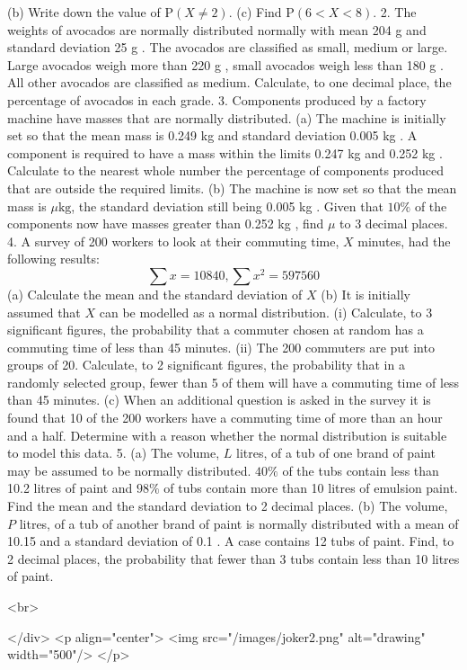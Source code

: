 (b) Write down the value of $\mathrm{P}(X \neq 2)$.
(c) Find $\mathrm{P}(6<X<8)$.
2. The weights of avocados are normally distributed normally with mean 204 g and standard deviation 25 g . The avocados are classified as small, medium or large. Large avocados weigh more than 220 g , small avocados weigh less than 180 g . All other avocados are classified as medium. Calculate, to one decimal place, the percentage of avocados in each grade.
3. Components produced by a factory machine have masses that are normally distributed.
(a) The machine is initially set so that the mean mass is 0.249 kg and standard deviation 0.005 kg . A component is required to have a mass within the limits 0.247 kg and 0.252 kg . Calculate to the nearest whole number the percentage of components produced that are outside the required limits.
(b) The machine is now set so that the mean mass is $\mu \mathrm{kg}$, the standard deviation still being 0.005 kg . Given that $10 \%$ of the components now have masses greater than 0.252 kg , find $\mu$ to 3 decimal places.
4. A survey of 200 workers to look at their commuting time, $X$ minutes, had the following results:
$$
\sum x=10840, \sum x^{2}=597560
$$
(a) Calculate the mean and the standard deviation of $X$
(b) It is initially assumed that $X$ can be modelled as a normal distribution.
(i) Calculate, to 3 significant figures, the probability that a commuter chosen at random has a commuting time of less than 45 minutes.
(ii) The 200 commuters are put into groups of 20. Calculate, to 2 significant figures, the probability that in a randomly selected group, fewer than 5 of them will have a commuting time of less than 45 minutes.
(c) When an additional question is asked in the survey it is found that 10 of the 200 workers have a commuting time of more than an hour and a half. Determine with a reason whether the normal distribution is suitable to model this data.
5. (a) The volume, $L$ litres, of a tub of one brand of paint may be assumed to be normally distributed. $40 \%$ of the tubs contain less than 10.2 litres of paint and $98 \%$ of tubs contain more than 10 litres of emulsion paint. Find the mean and the standard deviation to 2 decimal places.
(b) The volume, $P$ litres, of a tub of another brand of paint is normally distributed with a mean of 10.15 and a standard deviation of 0.1 . A case contains 12 tubs of paint. Find, to 2 decimal places, the probability that fewer than 3 tubs contain less than 10 litres of paint.

<br>

</div>
<p align="center">
<img src="/images/joker2.png" alt="drawing" width="500"/>
</p>
